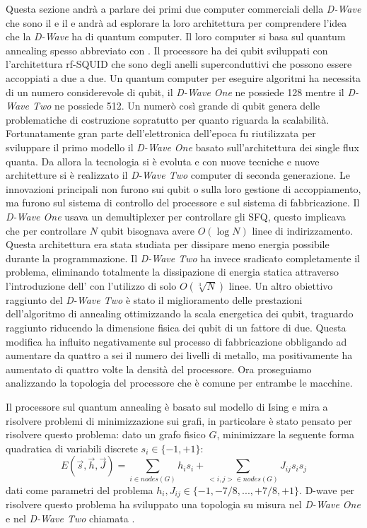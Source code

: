\cite{ACI}Questa sezione andrà a parlare dei primi due computer commerciali della \textit{D-Wave} che sono il  e il  e andrà ad esplorare la loro architettura per comprendere l'idea che la \textit{D-Wave} ha di quantum computer. Il loro computer si basa sul quantum annealing spesso abbreviato con . Il processore ha dei qubit sviluppati con l'architettura rf-SQUID che sono degli anelli superconduttivi che possono essere accoppiati a due a due. Un quantum computer per eseguire algoritmi ha necessita di un numero considerevole di qubit, il \textit{D-Wave One} ne possiede 128 mentre il \textit{D-Wave Two} ne possiede 512. Un numerò così grande di qubit genera delle problematiche di costruzione sopratutto per quanto riguarda la scalabilità. Fortunatamente gran parte dell'elettronica dell'epoca fu riutilizzata per sviluppare il primo modello il \textit{D-Wave One} basato sull'architettura dei  single flux quanta. Da allora la tecnologia si è evoluta e con nuove tecniche e nuove architetture si è realizzato il \textit{D-Wave Two} computer di seconda generazione. Le innovazioni principali non furono sui qubit o sulla loro gestione di accoppiamento, ma furono sul sistema di controllo del processore e sul sistema di fabbricazione. Il \textit{D-Wave One} usava un demultiplexer per controllare gli SFQ, questo implicava che per controllare $N$ qubit bisognava avere $O(\log{N})$ linee di indirizzamento. Questa architettura era stata studiata per dissipare meno energia possibile durante la programmazione. Il \textit{D-Wave Two} ha invece sradicato completamente il problema, eliminando totalmente la dissipazione di energia statica attraverso l'introduzione dell' con l'utilizzo di solo $O(\sqrt[3]{N})$ linee.
Un altro obiettivo raggiunto del \textit{D-Wave Two} è stato il miglioramento delle prestazioni dell'algoritmo di annealing ottimizzando la scala energetica dei qubit, traguardo raggiunto riducendo la dimensione fisica dei qubit di un fattore di due. Questa modifica ha influito negativamente sul processo di fabbricazione obbligando ad aumentare da quattro a sei il numero dei livelli di metallo, ma positivamente ha aumentato di quattro volte la densità del processore. Ora proseguiamo analizzando la topologia del processore che è comune per entrambe le macchine.

\cite{ACI}Il processore sul quantum annealing è basato sul modello di Ising e mira a risolvere problemi di minimizzazione sui grafi, in particolare è stato pensato per risolvere questo problema: dato un grafo fisico $G$, minimizzare la seguente forma quadratica di variabili discrete $s_i \in \{-1, +1\}$:
$$E(\vec{s}, \vec{h}, \vec{J}) = \sum_{i \in nodes(G)} h_i s_i + \sum_{<i,j> \in nodes(G)} J_{ij} s_i s_j$$
dati come parametri del problema $h_i, J_{ij} \in \{-1, -7/8, ..., +7/8, +1\}$.
D-wave per risolvere questo problema ha sviluppato una topologia su misura nel \textit{D-Wave One} e nel \textit{D-Wave Two} chiamata .

